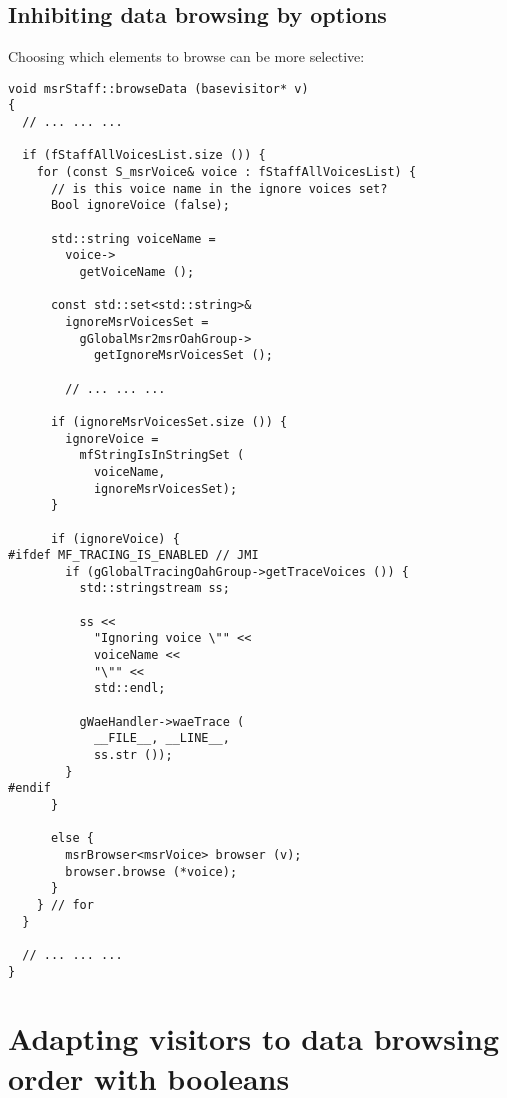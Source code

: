 \subsection{Inhibiting data browsing by options}

Choosing which elements to browse can be more selective:
\begin{lstlisting}[language=Terminal]
void msrStaff::browseData (basevisitor* v)
{
  // ... ... ...

  if (fStaffAllVoicesList.size ()) {
    for (const S_msrVoice& voice : fStaffAllVoicesList) {
      // is this voice name in the ignore voices set?
      Bool ignoreVoice (false);

      std::string voiceName =
        voice->
          getVoiceName ();

      const std::set<std::string>&
        ignoreMsrVoicesSet =
          gGlobalMsr2msrOahGroup->
            getIgnoreMsrVoicesSet ();

  		// ... ... ...

      if (ignoreMsrVoicesSet.size ()) {
        ignoreVoice =
          mfStringIsInStringSet (
            voiceName,
            ignoreMsrVoicesSet);
      }

      if (ignoreVoice) {
#ifdef MF_TRACING_IS_ENABLED // JMI
        if (gGlobalTracingOahGroup->getTraceVoices ()) {
          std::stringstream ss;

          ss <<
            "Ignoring voice \"" <<
            voiceName <<
            "\"" <<
            std::endl;

          gWaeHandler->waeTrace (
            __FILE__, __LINE__,
            ss.str ());
        }
#endif
      }

      else {
        msrBrowser<msrVoice> browser (v);
        browser.browse (*voice);
      }
    } // for
  }

  // ... ... ...
}
\end{lstlisting}

\section{Adapting visitors to data browsing order with booleans}

